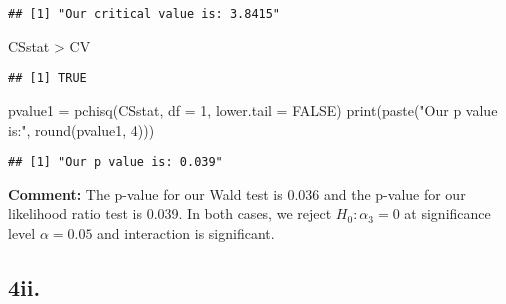 \documentclass[
]{article}
\newenvironment{Shaded}{\begin{snugshade}}{\end{snugshade}}
\newcommand{\AttributeTok}[1]{\textcolor[rgb]{0.77,0.63,0.00}{#1}}
\newcommand{\ConstantTok}[1]{\textcolor[rgb]{0.00,0.00,0.00}{#1}}
\newcommand{\DecValTok}[1]{\textcolor[rgb]{0.00,0.00,0.81}{#1}}
\newcommand{\FunctionTok}[1]{\textcolor[rgb]{0.00,0.00,0.00}{#1}}
\newcommand{\NormalTok}[1]{#1}
\newcommand{\OtherTok}[1]{\textcolor[rgb]{0.56,0.35,0.01}{#1}}
\newcommand{\SpecialCharTok}[1]{\textcolor[rgb]{0.00,0.00,0.00}{#1}}
\newcommand{\StringTok}[1]{\textcolor[rgb]{0.31,0.60,0.02}{#1}}
\begin{document}
\begin{verbatim}
## [1] "Our critical value is: 3.8415"
\end{verbatim}

\begin{Shaded}
\begin{Highlighting}[]
\NormalTok{CSstat }\SpecialCharTok{\textgreater{}}\NormalTok{ CV}
\end{Highlighting}
\end{Shaded}

\begin{verbatim}
## [1] TRUE
\end{verbatim}

\begin{Shaded}
\begin{Highlighting}[]
\NormalTok{pvalue1 }\OtherTok{=} \FunctionTok{pchisq}\NormalTok{(CSstat, }\AttributeTok{df =} \DecValTok{1}\NormalTok{, }\AttributeTok{lower.tail =} \ConstantTok{FALSE}\NormalTok{)}
\FunctionTok{print}\NormalTok{(}\FunctionTok{paste}\NormalTok{(}\StringTok{"Our p value is:"}\NormalTok{, }\FunctionTok{round}\NormalTok{(pvalue1, }\DecValTok{4}\NormalTok{)))}
\end{Highlighting}
\end{Shaded}

\begin{verbatim}
## [1] "Our p value is: 0.039"
\end{verbatim}

\textbf{Comment:} The p-value for our Wald test is 0.036 and the p-value
for our likelihood ratio test is 0.039. In both cases, we reject
\(H_0: \alpha_3=0\) at significance level \(\alpha=0.05\) and
interaction is significant.

\hypertarget{ii.-2}{%
\subsection{4ii.}\label{ii.-2}}
\end{document}
